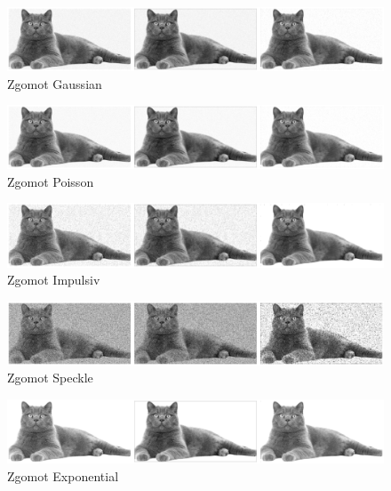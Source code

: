 \documentclass[12pt]{article}
\begin{document}
\begin{figure}[h!]
    \centering
    \includegraphics[width=1\textwidth]{images/row_1_filters.eps}
    \caption{Zgomot Gaussian}
    \label{fig:med_gaussian}
\end{figure}
\vspace{10pt} 
\begin{figure}[h!]
    \centering
    \includegraphics[width=1\textwidth]{images/row_2_filters.eps}
    \caption{Zgomot Poisson}
    \label{fig:med_poisson}
\end{figure}
\vspace{10pt}
\begin{figure}[h!]
    \centering
    \includegraphics[width=1\textwidth]{images/row_3_filters.eps}
    \caption{Zgomot Impulsiv}
    \label{fig:med_impulsiv}
\end{figure}
\vspace{10pt} \newpage
\begin{figure}[h!]
    \centering
    \includegraphics[width=1\textwidth]{images/row_4_filters.eps}
    \caption{Zgomot Speckle}
    \label{fig:med_speckle}
\end{figure}
\vspace{10pt}
\begin{figure}[h!]
    \centering
    \includegraphics[width=1\textwidth]{images/row_5_filters.eps}
    \caption{Zgomot Exponential}
    \label{fig:med_exponential}
\end{figure}
\end{document}
